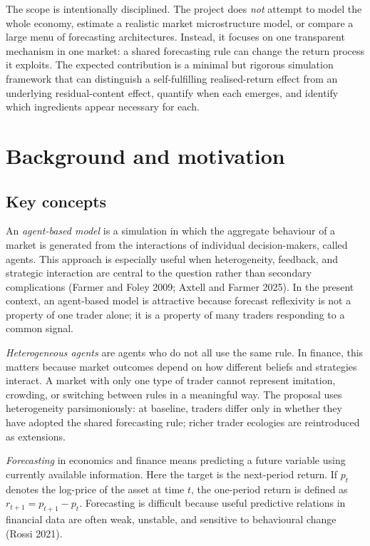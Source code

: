 \documentclass[11pt]{article}
\begin{document}
The scope is intentionally disciplined. The project does \emph{not} attempt to model the whole economy, estimate a realistic market microstructure model, or compare a large menu of forecasting architectures. Instead, it focuses on one transparent mechanism in one market: a shared forecasting rule can change the return process it exploits. The expected contribution is a minimal but rigorous simulation framework that can distinguish a self-fulfilling realised-return effect from an underlying residual-content effect, quantify when each emerges, and identify which ingredients appear necessary for each.


\section{Background and motivation}

\subsection{Key concepts}

An \emph{agent-based model} is a simulation in which the aggregate behaviour of a market is generated from the interactions of individual decision-makers, called agents. This approach is especially useful when heterogeneity, feedback, and strategic interaction are central to the question rather than secondary complications (Farmer and Foley 2009; Axtell and Farmer 2025). In the present context, an agent-based model is attractive because forecast reflexivity is not a property of one trader alone; it is a property of many traders responding to a common signal.

\emph{Heterogeneous agents} are agents who do not all use the same rule. In finance, this matters because market outcomes depend on how different beliefs and strategies interact. A market with only one type of trader cannot represent imitation, crowding, or switching between rules in a meaningful way. The proposal uses heterogeneity parsimoniously: at baseline, traders differ only in whether they have adopted the shared forecasting rule; richer trader ecologies are reintroduced as extensions.

\emph{Forecasting} in economics and finance means predicting a future variable using currently available information. Here the target is the next-period return. If $p_t$ denotes the log-price of the asset at time $t$, the one-period return is defined as $r_{t+1} = p_{t+1} - p_t$. Forecasting is difficult because useful predictive relations in financial data are often weak, unstable, and sensitive to behavioural change (Rossi 2021).
\end{document}
